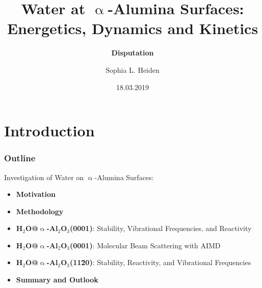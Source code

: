 \documentclass[hyperref={pdfpagelabels=false}]{beamer}
\begin{document}
\title{Water at $\upalpha$-Alumina Surfaces: Energetics, Dynamics and Kinetics}
\subtitle{{\bf Disputation}}   
\author{Sophia L. Heiden}
\date{18.03.2019}

\begin{frame}[plain]
 \addtocounter{framenumber}{-2}
\titlepage
\end{frame} 

\section[]{Introduction}
\begin{frame}[plain]
\frametitle{Outline}
 Investigation of Water on $\upalpha$-Alumina Surfaces: \newline 
\begin{itemize}
 \item \textbf{Motivation}
 \item \textbf{Methodology}
 \item \textbf{H$_2$O@$\upalpha$-Al$_2$O$_3$(0001)}: Stability, Vibrational Frequencies, and Reactivity
 \item \textbf{H$_2$O@$\upalpha$-Al$_2$O$_3$(0001)}: Molecular Beam Scattering with AIMD
 \item \textbf{H$_2$O@$\upalpha$-Al$_2$O$_3$(11\=20)}: Stability, Reactivity, and Vibrational Frequencies
 \item \textbf{Summary and Outlook}
 \end{itemize}
\end{frame}
\end{document}

